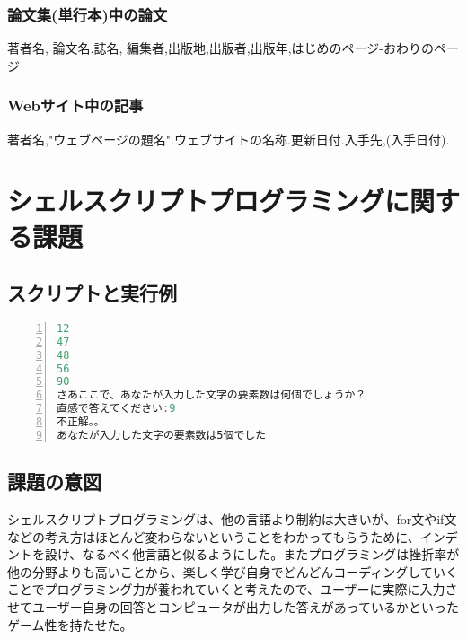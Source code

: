 \documentclass[a4paper, 11pt, titlepage]{jsarticle}
\begin{document}
\subsubsection{論文集(単行本)中の論文}
著者名, 論文名.誌名, 編集者,出版地,出版者,出版年,はじめのページ-おわりのページ
\subsubsection{Webサイト中の記事}
著者名,"ウェブページの題名".ウェブサイトの名称.更新日付.入手先,(入手日付).

\section{シェルスクリプトプログラミングに関する課題}
\subsection{スクリプトと実行例}


\begin{lstlisting}[language=C, numbers=left, breaklines=true, basicstyle=\ttfamily\footnotesize, frame=single, caption=実行結果,label=result]
12
47
48
56
90
さあここで、あなたが入力した文字の要素数は何個でしょうか？
直感で答えてください:9
不正解。。
あなたが入力した文字の要素数は5個でした
\end{lstlisting}
\newpage

\subsection{課題の意図}
シェルスクリプトプログラミングは、他の言語より制約は大きいが、for文やif文などの考え方はほとんど変わらないということをわかってもらうために、インデントを設け、なるべく他言語と似るようにした。またプログラミングは挫折率が他の分野よりも高いことから、楽しく学び自身でどんどんコーディングしていくことでプログラミング力が養われていくと考えたので、ユーザーに実際に入力させてユーザー自身の回答とコンピュータが出力した答えがあっているかといったゲーム性を持たせた。
\end{document}
